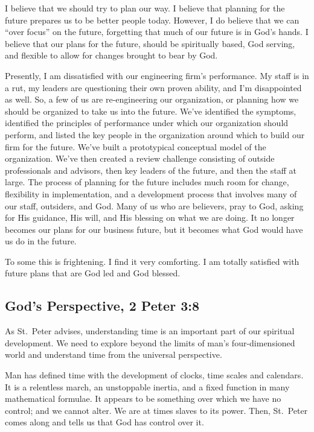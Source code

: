 \documentclass[12pt]{memoir}
\begin{document}
I believe that we should try to plan our way. I believe that planning for the future prepares us to be better people today. However, I do believe that we can ``over focus'' on the future, forgetting that much of our future is in God's hands. I believe that our plans for the future, should be spiritually based, God serving, and flexible to allow for changes brought to bear by God.

Presently, I am dissatisfied with our engineering firm's performance.
My staff is in a rut, my leaders are questioning their own proven
ability, and I'm disappointed as well. So, a few of us are re-engineering
our organization, or planning how we should be organized to take us
into the future. We've identified the symptoms, identified the principles
of performance under which our organization should perform, and listed
the key people in the organization around which to build our firm
for the future. We've built a prototypical conceptual model of the
organization. We've then created a review challenge consisting of
outside professionals and advisors, then key leaders of the future,
and then the staff at large. The process of planning for the future
includes much room for change, flexibility in implementation, and
a development process that involves many of our staff, outsiders,
and God. Many of us who are believers, pray to God, asking for His
guidance, His will, and His blessing on what we are doing. It no longer
becomes our plans for our business future, but it becomes what God
would have us do in the future.

To some this is frightening. I find it very comforting. I am totally
satisfied with future plans that are God led and God blessed.

\subsection[God's Perspective]{God's Perspective, 2 Peter 3:8}

As St.\ Peter advises, understanding time is an important part
of our spiritual development. We need to explore beyond the limits
of man's four-dimensioned world and understand time from the universal
perspective.

Man has defined time with the development of clocks, time scales and
calendars. It is a relentless march, an unstoppable inertia, and a
fixed function in many mathematical formulae. It appears to be something
over which we have no control; and we cannot alter. We are at times slaves to its power. Then, St.\ Peter comes along and tells us that
God has control over it. 
\end{document}

